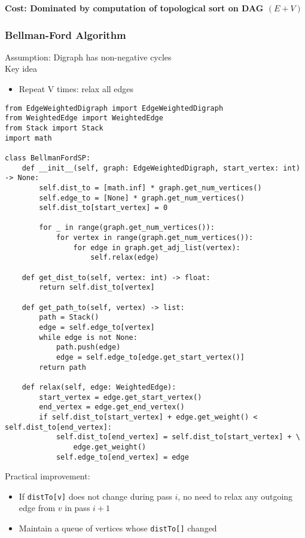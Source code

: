 \documentclass[a4paper]{article}
\begin{document}
\textbf{Cost: Dominated by computation of topological sort on DAG $(E+V)$}

\subsubsection*{Bellman-Ford Algorithm}
Assumption: Digraph has non-negative cycles\\
Key idea 
\begin{itemize}
    \item Repeat V times: relax all edges
\end{itemize}

\begin{lstlisting}
from EdgeWeightedDigraph import EdgeWeightedDigraph
from WeightedEdge import WeightedEdge
from Stack import Stack
import math

class BellmanFordSP:
    def __init__(self, graph: EdgeWeightedDigraph, start_vertex: int) -> None:
        self.dist_to = [math.inf] * graph.get_num_vertices()
        self.edge_to = [None] * graph.get_num_vertices()
        self.dist_to[start_vertex] = 0

        for _ in range(graph.get_num_vertices()):
            for vertex in range(graph.get_num_vertices()):
                for edge in graph.get_adj_list(vertex):
                    self.relax(edge)

    def get_dist_to(self, vertex: int) -> float:
        return self.dist_to[vertex]

    def get_path_to(self, vertex) -> list:
        path = Stack()
        edge = self.edge_to[vertex]
        while edge is not None:
            path.push(edge)
            edge = self.edge_to[edge.get_start_vertex()]
        return path

    def relax(self, edge: WeightedEdge):
        start_vertex = edge.get_start_vertex()
        end_vertex = edge.get_end_vertex()
        if self.dist_to[start_vertex] + edge.get_weight() < self.dist_to[end_vertex]:
            self.dist_to[end_vertex] = self.dist_to[start_vertex] + \
                edge.get_weight()
            self.edge_to[end_vertex] = edge
\end{lstlisting}
Practical improvement:
\begin{itemize}
    \item If \verb|distTo[v]| does not change during pass $i$, no need to relax any outgoing edge from $v$ in pass $i+1$
    \item Maintain a queue of vertices whose \verb|distTo[]| changed
\end{itemize}
\end{document}
